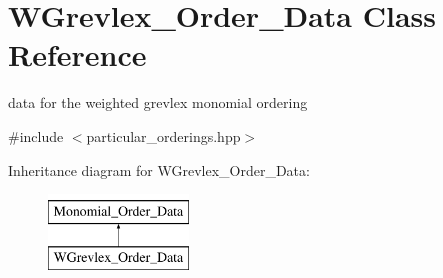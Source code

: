 \hypertarget{class_w_grevlex___order___data}{}\section{W\+Grevlex\+\_\+\+Order\+\_\+\+Data Class Reference}
\label{class_w_grevlex___order___data}


data for the weighted grevlex monomial ordering  




{\ttfamily \#include $<$particular\+\_\+orderings.\+hpp$>$}

Inheritance diagram for W\+Grevlex\+\_\+\+Order\+\_\+\+Data\+:\begin{figure}[H]
\begin{center}
\leavevmode
\includegraphics[height=2.000000cm]{class_w_grevlex___order___data}
\end{center}
\end{figure}
